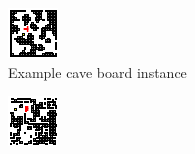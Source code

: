 \begin{figure}
\centering
\begin{subfigure}[b]{0.45\textwidth}
\centering
\includegraphics[width=\textwidth]{figures/example_boards/cave_example.pdf}
\caption{Example cave board instance}
\label{fig:cave}
\end{subfigure}
\hfill
\begin{subfigure}[b]{0.45\textwidth}
\centering
\includegraphics[width=\textwidth]{figures//example_boards/maze_example.pdf}

\end{subfigure}
\end{figure}
